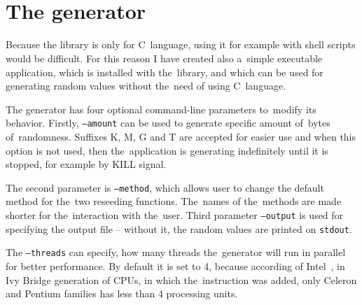 \\


\\


\section{The generator} \label{sec:generator}

Because the library is only for C~language, using it for example with shell scripts would be difficult. For this reason I have created also a~simple executable application, which is installed with the~library, and which can be used for generating random values without the~need of using C~language.

The generator has four optional command-line parameters to~modify its behavior. Firstly, {\tt --amount} can be used to generate specific amount of~bytes of~randomness. Suffixes K, M, G and T are accepted for easier use and when this option is not used, then the~application is generating indefinitely until it is stopped, for example by KILL signal.

The second parameter is {\tt --method}, which allows user to change the default method  for the~two reseeding functions. The~names of the~methods are made shorter for the~interaction with the~user. Third parameter {\tt --output} is used for specifying the output file -- without it, the random values are printed on {\tt stdout}. 

The {\tt --threads} can specify, how many threads the~generator will run in parallel for better performance. By default it is set to 4, because according of Intel~\cite{IntelArk}, in Ivy Bridge generation of CPUs, in which the~instruction was added, only Celeron and Pentium families has less than 4 processing units.


